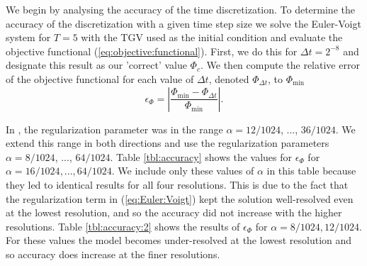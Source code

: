We begin by analysing the accuracy of the time discretization. To determine the accuracy of the discretization with a given time step size we solve the Euler-Voigt system for $T=5$ with the TGV used as the initial condition and evaluate the objective functional (\ref{eq:objective:functional}). First, we do this for $\Delta t = 2^{-8}$ and designate this result as our 'correct' value $\Phi_c$. We then compute the relative error of the objective functional for each value of $\Delta t$, denoted $\Phi_{\Delta t}$, to $\Phi_{\min}$
\begin{equation}\label{eq:epsilon:phi}
\epsilon_{\Phi} = \left|\frac{\Phi_{\min} - \Phi_{\Delta t}}{\Phi_{\min}}\right|.
\end{equation}

\noindent In \cite{larios_computational_2018}, the regularization parameter was in the range $\alpha=12/1024$, ..., $36/1024$. We extend this range in both directions and use the regularization parameters $\alpha = 8/1024$, ..., $64/1024$. Table \ref{tbl:accuracy} shows the values for $\epsilon_{\Phi}$ for $\alpha=16/1024,...,64/1024$. We include only these values of $\alpha$ in this table because they led to identical results for all four resolutions. This is due to the fact that the regularization term in (\ref{eq:Euler:Voigt}) kept the solution well-resolved even at the lowest resolution, and so the accuracy did not increase with the higher resolutions. Table \ref{tbl:accuracy:2} shows the results of $\epsilon_{\Phi}$ for $\alpha=8/1024,12/1024$. For these values the model becomes under-resolved at the lowest resolution and so accuracy does increase at the finer resolutions. 

